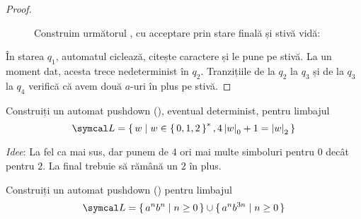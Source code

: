 \begin{proof}~
    \begin{figure}[H]
        \centering
        \caption*{Construim următorul \pda{}, cu acceptare prin stare finală și stivă vidă:}
    \end{figure}

    În starea \(q_1\), automatul ciclează, citește caractere și le pune pe stivă. La un moment dat, acesta trece nedeterminist în \(q_2\). Tranzițiile de la \(q_2\) la \(q_3\) și de la \(q_3\) la \(q_4\) verifică că avem două \(a\)-uri în plus pe stivă.
\end{proof}

\begin{exercise}
    Construiți un automat pushdown (\pda{}), eventual determinist, pentru limbajul
    \[
        \limbaj = \set{ w | w \in \set{0, 1, 2}^*, 4\abs{w}_0 + 1 = \abs{w}_2 }
    \]
\end{exercise}

\textit{Idee}: La fel ca mai sus, dar punem de 4 ori mai multe simboluri pentru \(0\) decât pentru \(2\). La final trebuie să rămână un \(2\) în plus.

\begin{exercise}
    Construiți un automat pushdown (\pda{}) pentru limbajul
    \[
        \limbaj = \set{ a^n b^n | n \geq 0 } \cup \set{ a^n b^{3n} | n \geq 0 }
    \]
\end{exercise}

